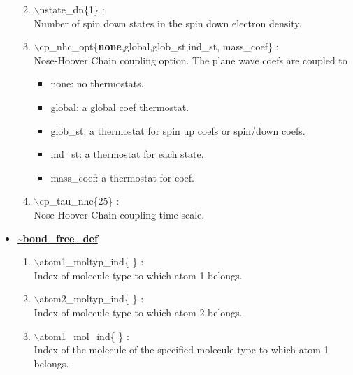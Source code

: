 \begin{itemize}
\begin{enumerate}
 \vspace{0.15in} \Large
 \item  $\backslash$nstate\_dn\{1\} : \\
    \large
     Number of spin down states in the spin down electron density.

 \vspace{0.15in} \Large
 \item  $\backslash$cp\_nhc\_opt\{{\bf none},global,glob\_st,ind\_st,
                                  mass\_coef\} : \\
    \large
     Nose-Hoover Chain coupling option. The plane wave coefs are coupled to
      \begin{itemize}
         \item none:     no thermostats.
         \item global:   a global coef thermostat.
         \item glob\_st: a thermostat for spin up coefs or spin/down coefs. 
         \item ind\_st:  a thermostat for each state. 
         \item mass\_coef:  a thermostat for coef.
      \end{itemize}

 \vspace{0.15in} \Large
 \item  $\backslash$cp\_tau\_nhc\{25\} : \\
    \large
     Nose-Hoover Chain coupling time scale.

\end{enumerate}

\clearpage
\huge
\item[] \underline{\bf \~{}bond\_free\_def}
\begin{enumerate}

 \vspace{0.15in} \Large
 \item  $\backslash$atom1\_moltyp\_ind\{ \} : \\ 
    \large
    Index of molecule type to which atom 1 belongs.

 \vspace{0.15in} \Large
 \item  $\backslash$atom2\_moltyp\_ind\{ \} : \\ 
    \large
    Index of molecule type to which atom 2 belongs.

 \vspace{0.15in} \Large
 \item  $\backslash$atom1\_mol\_ind\{ \} : \\    
    \large
    Index of the molecule of the specified molecule type 
    to which atom 1 belongs.


\end{enumerate}
\end{itemize}

